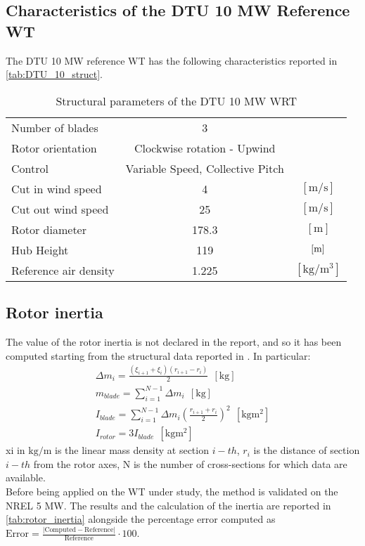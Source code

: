 \subsection{Characteristics of the DTU 10 MW Reference WT}
The DTU 10 MW reference WT has the following characteristics reported in \autoref{tab:DTU_10_struct}.
\begin{table}[htb]
    \caption{Structural parameters of the DTU 10 MW \acrshort{WRT}}
    \centering
    \begin{tabular}{lcc}
    \toprule
    Number of blades & 3 & \\
    Rotor orientation & Clockwise rotation - Upwind & \\
    Control & Variable Speed, Collective Pitch & \\
    Cut in wind speed & 4 & $\left[\si{\meter \per \second}\right]$ \\
    Cut out wind speed & 25 & $\left[\si{\meter \per \second}\right]$ \\
    Rotor diameter & 178.3 & $\left[\si{\meter}\right]$\\
    Hub Height & 119 & $\left[\si{\meter}\right]$\\
    Reference air density & 1.225 & $\left[\si{\kilo\gram\per\cubic\meter}\right]$\\
    \bottomrule
    \end{tabular}
    \label{tab:DTU_10_struct}
\end{table}

\subsection{Rotor inertia}
The value of the rotor inertia is not declared in the report, and so it has been computed starting from the structural data reported in \cite{DTU_Wind_Energy_Report-I-0092}. In particular:
\begin{gather}
    \Delta m_i=\frac{\left(\xi_{i+1} + \xi_i\right)\left(r_{i+1} - r_i\right)}{2} \ \ \left[\si{\kilo\gram}\right] \\
    m_{blade} = \sum_{i=1}^{N-1}\Delta m_i \ \ \left[\si{\kilo\gram}\right]\\
    I_{blade}=\sum_{i=1}^{N-1}\Delta m_i\left(\frac{r_{i+1} + r_i}{2}\right)^2 \ \ \left[\si{\kilo\gram\square\meter}\right]\\
    I_{rotor}=3I_{blade} \ \ \left[\si{\kilo\gram\square\meter}\right]
\end{gather}
\acrshort{xi} in $\si{\kilo\gram\per\meter}$ is the linear mass density at section $i-th$, $r_i$ is the distance of section $i-th$ from the rotor axes, \acrshort{N} is the number of cross-sections for which data are available.\\
Before being applied on the \acrshort{WT} under study, the method is validated on the NREL 5 MW. The results and the calculation of the inertia are reported in \autoref{tab:rotor_inertia} alongside the percentage error computed as $\text{Error}=\frac{ |\text{Computed} - \text{Reference}| }{\text{Reference}}\cdot 100$.

